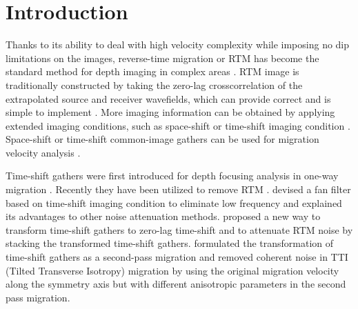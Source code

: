 \section{Introduction}
Thanks to its ability to deal with high velocity complexity
while imposing no dip limitations on the images, 
reverse-time migration or RTM \cite[]{baysal83,mcmechan83,whitmore83gp} 
has become the standard method for depth imaging in complex areas
\cite[]{zhang07gp,etgen09,zhang11,zhu14b,casasanta15gp}.
RTM image is traditionally constructed by taking the zero-lag crosscorrelation of the extrapolated source and
receiver wavefields, which can provide correct   and is simple to implement \cite[]{claerbout85}.
More imaging information can be obtained by applying extended imaging conditions, such as space-shift or time-shift imaging condition \cite[]{sava06,sava11}.
Space-shift or time-shift common-image gathers can be used for migration velocity analysis \cite[]{sava03,biondi04,fomel11}.

Time-shift gathers were first introduced for depth focusing analysis in one-way migration \cite[]{faye86gp,mackay92,nemeth96gp}.
Recently\new{,} they have been utilized to remove RTM  . 
\cite{kaelin11gp} devised a fan filter based on time-shift imaging condition to eliminate low frequency   and explained its advantages to other noise attenuation methods.
\cite{khalil13gp} proposed a new way to transform time-shift gathers to zero-lag time-shift and
to attenuate RTM noise by stacking the transformed time-shift gathers.
\cite{xu14} formulated the transformation of time-shift gathers as a second-pass migration
and removed coherent noise in TTI (Tilted Transverse Isotropy) migration by using the original migration velocity along the symmetry axis but with different
anisotropic parameters in the second pass migration.

